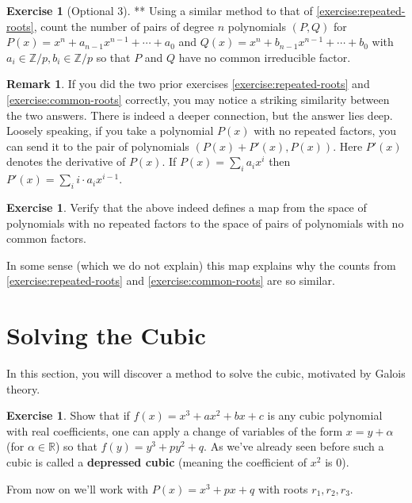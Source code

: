 \documentclass[reqno, 12pt, letter]{article}
\theoremstyle{plain}
\theoremstyle{definition}
\newtheorem{remark}[theorem]{Remark}
\newtheorem{exercise}[theorem]{Exercise}
\theoremstyle{remark}
\numberwithin{equation}{section}
\newcommand\br{{\mathbb R}}
\newcommand\bz{{\mathbb Z}}
\begin{document}
\begin{exercise}[Optional 3]**
	\label{exercise:common-roots}
	Using a similar method to that of \autoref{exercise:repeated-roots},
	count the number of pairs of degree $n$ polynomials $(P,Q)$ for 
	$P(x) = x^n + a_{n-1}x^{n-1} + \cdots + a_0$ and $Q(x) = x^n + b_{n-1}x^{n-1} + \cdots + b_0$
	with $a_i \in \bz/p, b_i \in \bz/p$ so that $P$ and $Q$ have no common irreducible factor.
\end{exercise}
\begin{remark}
	\label{remark:}
	If you did the two prior exercises \autoref{exercise:repeated-roots} and \autoref{exercise:common-roots} correctly, you may notice a striking similarity
between the two answers. There is indeed a deeper connection, but the answer lies deep.
Loosely speaking, if you take a polynomial $P(x)$ with no repeated factors, you can send it
to the pair of polynomials $(P(x) + P'(x), P(x))$. Here $P'(x)$ denotes the derivative of $P(x)$.
If $P(x) = \sum_i a_ix^i$ then $P'(x) = \sum_i  i \cdot a_i x^{i-1}$.
\begin{exercise}
	\label{exercise:}
	Verify that the above indeed defines a map
from the space of polynomials with no repeated factors to the
space of pairs of polynomials with no common factors.
\end{exercise}

In some sense (which we do not explain) this map explains why the counts from 
\autoref{exercise:repeated-roots} and \autoref{exercise:common-roots} are so similar.
\end{remark}



\newpage
\section{Solving the Cubic}
	In this section, you will discover a method to solve the cubic, motivated by Galois theory.
	
	\begin{exercise}
		\label{exercise:}
		Show that if $f(x) = x^3 + ax^2 +bx +c$ is any cubic polynomial with real coefficients, one can apply
		a change of variables of the form $x = y + \alpha$ (for $\alpha \in \br$)
		so that $f(y) = y^3 + py^2 + q$.
		As we've already seen before such a cubic is called a {\bf depressed cubic} (meaning the coefficient of $x^2$ is $0$).
	\end{exercise}

	From now on we'll work with $P(x) = x^3 + px + q$ with roots $ r_1, r_2, r_3$.
	
\end{document}
